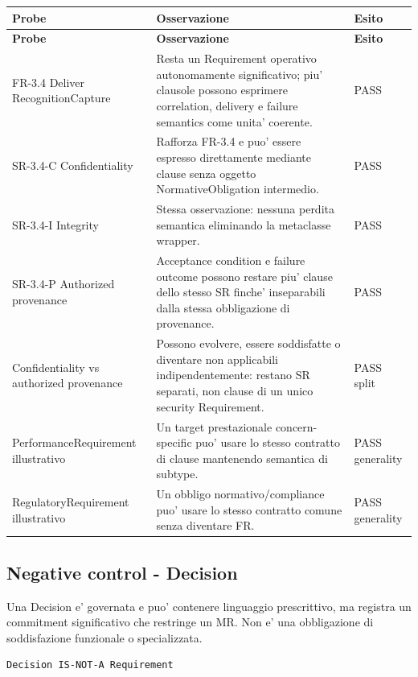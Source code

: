 \documentclass[11pt,a4paper]{article}
\begin{document}
\small
\begin{longtable}{p{}p{}p{}}
\toprule
\textbf{Probe} & \textbf{Osservazione} & \textbf{Esito} \\
\midrule
\endfirsthead
\toprule
\textbf{Probe} & \textbf{Osservazione} & \textbf{Esito} \\
\midrule
\endhead
FR-3.4 Deliver RecognitionCapture & Resta un Requirement operativo autonomamente significativo; piu' clausole possono esprimere correlation, delivery e failure semantics come unita' coerente. & PASS \\
\addlinespace
SR-3.4-C Confidentiality & Rafforza FR-3.4 e puo' essere espresso direttamente mediante clause senza oggetto NormativeObligation intermedio. & PASS \\
\addlinespace
SR-3.4-I Integrity & Stessa osservazione: nessuna perdita semantica eliminando la metaclasse wrapper. & PASS \\
\addlinespace
SR-3.4-P Authorized provenance & Acceptance condition e failure outcome possono restare piu' clause dello stesso SR finche' inseparabili dalla stessa obbligazione di provenance. & PASS \\
\addlinespace
Confidentiality vs authorized provenance & Possono evolvere, essere soddisfatte o diventare non applicabili indipendentemente: restano SR separati, non clause di un unico security Requirement. & PASS split \\
\addlinespace
PerformanceRequirement illustrativo & Un target prestazionale concern-specific puo' usare lo stesso contratto di clause mantenendo semantica di subtype. & PASS generality \\
\addlinespace
RegulatoryRequirement illustrativo & Un obbligo normativo/compliance puo' usare lo stesso contratto comune senza diventare FR. & PASS generality \\
\bottomrule
\end{longtable}
\normalsize

\subsection{Negative control - Decision}

Una Decision e' governata e puo' contenere linguaggio prescrittivo, ma registra un commitment significativo che restringe un MR. Non e' una obbligazione di soddisfazione funzionale o specializzata.

\begin{lstlisting}
Decision IS-NOT-A Requirement
\end{lstlisting}
\end{document}
